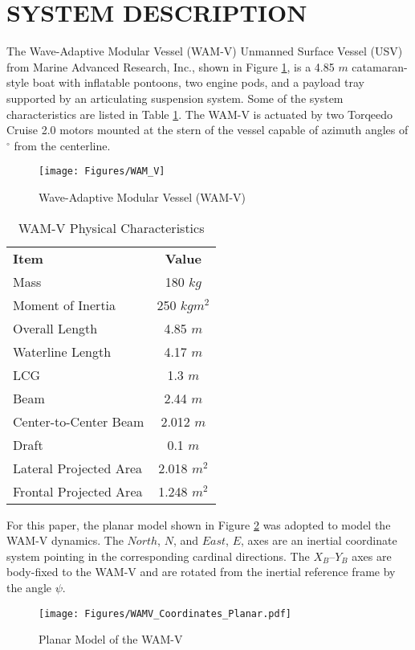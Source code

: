 \documentclass[letterpaper, 10 pt, conference]{ieeeconf}  %
\begin{document}
\section{SYSTEM DESCRIPTION}
The Wave-Adaptive Modular Vessel (WAM-V) Unmanned Surface Vessel (USV) from Marine Advanced Research, Inc., shown in Figure \ref{fig:WAM-V}, is a 4.85 $m$ catamaran-style boat with inflatable pontoons, two engine pods, and a payload tray supported by an articulating suspension system. Some of the system characteristics are listed in Table \ref{Physical Characteristics}. The WAM-V is actuated by two Torqeedo Cruise 2.0 motors mounted at the stern of the vessel capable of azimuth angles of \ensuremath{^\circ} from the centerline.
%
\begin{figure}[tb]
  \centering
  \vspace{0.3in}
  \texttt{[image: Figures/WAM\_V]}
  \caption{Wave-Adaptive Modular Vessel (WAM-V)}
  \label{fig:WAM-V}
\end{figure}
%
\begin{table}[tb]
\caption{WAM-V Physical Characteristics}
\vspace{-0.1in}
\label{Physical Characteristics}
  \begin{center}
    \begin{tabular}{lc}
    \textbf{Item} & \textbf{Value}\\
    Mass & 180 $kg$\\
    Moment of Inertia & 250 $kgm^2$\\
    Overall Length & 4.85 $m$\\
    Waterline Length & 4.17 $m$\\
    LCG & 1.3 $m$\\
    Beam & 2.44 $m$\\
    Center-to-Center Beam & 2.012 $m$\\
    Draft & 0.1 $m$\\
    Lateral Projected Area & 2.018 $m^2$\\
    Frontal Projected Area & 1.248 $m^2$\\
    \end{tabular}
  \end{center}
\end{table}

For this paper, the planar model shown in Figure \ref{fig:Coordinates} was adopted to model the WAM-V dynamics. The $North$, $N$, and $East$, $E$, axes are an inertial coordinate system pointing in the corresponding cardinal directions. The $X_B$--$Y_B$ axes are body-fixed to the WAM-V and are rotated from the inertial reference frame by the angle $\psi$.
\begin{figure}[tb]
  \centering
  \texttt{[image: Figures/WAMV\_Coordinates\_Planar.pdf]}
  \caption{Planar Model of the WAM-V}
  \label{fig:Coordinates}
\end{figure}
%
\end{document}
